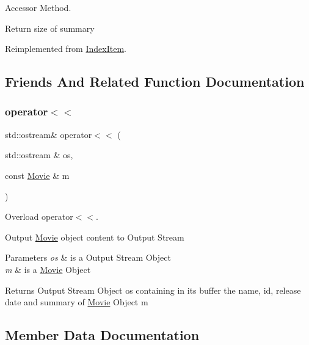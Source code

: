 Accessor Method. 

Return size of summary 

Reimplemented from \hyperlink{class_index_item_aa910a42ef4f6d7087297ac7fb8cf4a6c}{Index\+Item}.



\subsection{Friends And Related Function Documentation}
\mbox{\label{class_movie_ad206ecf2beecb9cdf5f22d316a5930b5}} 
\subsubsection{\texorpdfstring{operator$<$$<$}{operator<<}}
{\footnotesize\ttfamily std\+::ostream\& operator$<$$<$ (\begin{DoxyParamCaption}\item[{std\+::ostream \&}]{os,  }\item[{const \hyperlink{class_movie}{Movie} \&}]{m }\end{DoxyParamCaption})\hspace{0.3cm}{\ttfamily [friend]}}



Overload operator$<$$<$. 

Output \hyperlink{class_movie}{Movie} object content to Output Stream


\begin{DoxyParams}{Parameters}
{\em os} & is a Output Stream Object \\
\hline
{\em m} & is a \hyperlink{class_movie}{Movie} Object \\
\hline
\end{DoxyParams}
\begin{DoxyReturn}{Returns}
Output Stream Object os containing in its buffer the name, id, release date and summary of \hyperlink{class_movie}{Movie} Object m 
\end{DoxyReturn}


\subsection{Member Data Documentation}
\mbox{\label{class_movie_aadb7c41518aa8d7d8301793368cef929}} 
